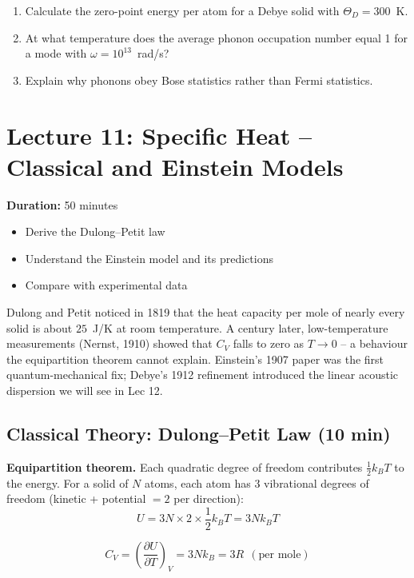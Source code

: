 \documentclass[11pt,a4paper]{article}
\newcommand{\lecheader}[3]{%
  \section{Lecture #1: #2}
  \noindent\textbf{Duration:} #3\par\vspace{4pt}
}
\begin{document}
\begin{probbox}
\begin{enumerate}
\item Calculate the zero-point energy per atom for a Debye solid with $\Theta_D=300$~K.
\item At what temperature does the average phonon occupation number equal 1 for a
mode with $\omega=10^{13}$~rad/s?
\item Explain why phonons obey Bose statistics rather than Fermi statistics.
\end{enumerate}
\end{probbox}

\newpage
\lecheader{11}{Specific Heat -- Classical and Einstein Models}{50 minutes}

\begin{keybox}
\begin{itemize}
\item Derive the Dulong--Petit law
\item Understand the Einstein model and its predictions
\item Compare with experimental data
\end{itemize}
\end{keybox}

\begin{histbox}
Dulong and Petit noticed in 1819 that the heat capacity per mole of nearly every
solid is about $25$~J/K at room temperature. A century later, low-temperature
measurements (Nernst, 1910) showed that $C_V$ falls to zero as $T\to0$ -- a
behaviour the equipartition theorem cannot explain. Einstein's 1907 paper was
the first quantum-mechanical fix; Debye's 1912 refinement introduced the linear
acoustic dispersion we will see in Lec 12.
\end{histbox}

\subsection{Classical Theory: Dulong--Petit Law \hfill \small(10 min)}

\textbf{Equipartition theorem.} Each quadratic degree of freedom contributes
$\tfrac12k_BT$ to the energy. For a solid of $N$ atoms, each atom has 3 vibrational
degrees of freedom (kinetic + potential $=2$ per direction):
\[
U = 3N\times2\times\frac12k_BT = 3Nk_BT
\]

\begin{keybox}
\[
C_V = \left(\frac{\partial U}{\partial T}\right)_V = 3Nk_B = 3R \ \ (\text{per mole})
\]
\end{keybox}
\end{document}
